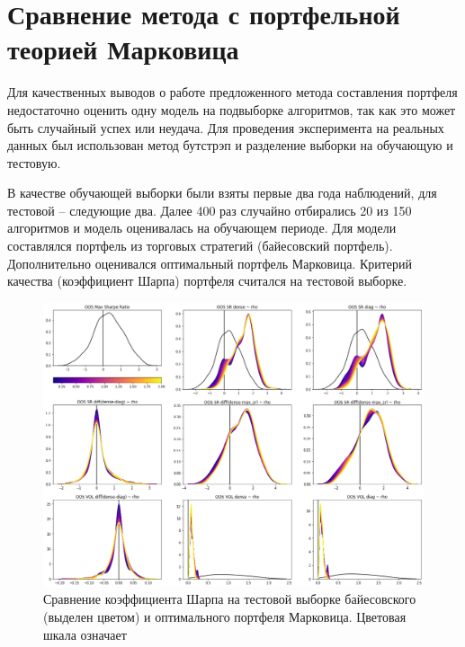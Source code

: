 \section{Сравнение метода с портфельной теорией Марковица}
Для качественных выводов о работе предложенного метода составления портфеля недостаточно оценить одну модель на подвыборке алгоритмов, так как это может быть случайный успех или неудача. Для проведения эксперимента на реальных данных был использован метод бутстрэп \citep{grimshaw1995} и разделение выборки на обучающую и тестовую. 

В качестве обучающей выборки были взяты первые два года наблюдений, для тестовой -- следующие два. Далее 400 раз случайно отбирались 20 из 150 алгоритмов и модель оценивалась на обучающем периоде. Для модели составлялся портфель из торговых стратегий (байесовский портфель). Дополнительно оценивался оптимальный портфель Марковица. Критерий качества (коэффициент Шарпа) портфеля считался на тестовой выборке.

\begin{figure}[t]
	\centering
	\includegraphics[width=\linewidth]{Thesis/images/performance}
	\caption{Сравнение коэффициента Шарпа на тестовой выборке байесовского (выделен цветом) и оптимального портфеля Марковица. Цветовая шкала означает }
	\label{fig:performance}
\end{figure}

